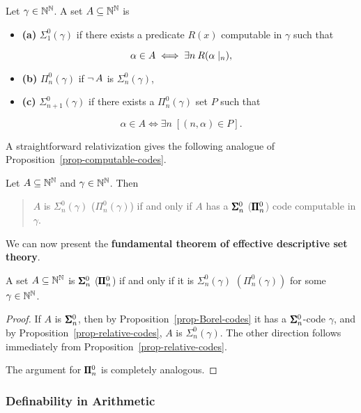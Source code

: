 \begin{definition}Let $\gamma \in \mathbb{N}^{\mathbb{N}}$. A set $A \subseteq \mathbb{N}^{\mathbb{N}}$ is

\begin{itemize}
\item \textbf{(a)} $\Sigma^0_1(\gamma)$ if there exists a predicate $R(x)$ computable in $\gamma$ such that
\end{itemize}
\begin{equation*}
\alpha \in A \iff \exists n \: R(\alpha\mid_{n}),
\end{equation*}
\begin{itemize}
\item \textbf{(b)} $\Pi^0_n(\gamma)$ if $\neg \, A$ is $\Sigma^0_n(\gamma)$,
\item \textbf{(c)} $\Sigma^0_{n+1}(\gamma)$ if there exists a $\Pi^0_n(\gamma)$ set $P$ such that
\end{itemize}
\begin{equation*}
\alpha \in A \iff \exists n \;[(n,\alpha) \in P].
\end{equation*}
\end{definition}A straightforward relativization gives the following analogue of Proposition~\ref{prop-computable-codes}.

\begin{proposition}\label{prop-relative-codes}Let $A \subseteq \mathbb{N}^{\mathbb{N}}$ and $\gamma \in \mathbb{N}^{\mathbb{N}}$. Then

\begin{quote}
$A$ is $\Sigma^0_n(\gamma)$ ($\Pi^0_n(\gamma)$) if and only if $A$ has a $\pmb{\Sigma}^0_n$ ($\pmb{\Pi}^0_n$) code computable in $\gamma$.
\end{quote}

\end{proposition}We can now present the \textbf{fundamental theorem of effective descriptive set theory}.

\begin{theorem}\label{thm-fundamental}A set $A \subseteq \mathbb{N}^{\mathbb{N}}$ is $\pmb{\Sigma}^0_n$ ($\pmb{\Pi}^0_n$) if and only if it is $\Sigma^0_n(\gamma)$ $(\Pi^0_n(\gamma))$ for some $\gamma \in \mathbb{N}^{\mathbb{N}}$.

\end{theorem}\begin{proof}If $A$ is $\pmb{\Sigma}^0_n$, then by Proposition~\ref{prop-Borel-codes} it has a $\pmb{\Sigma}^0_n$-code $\gamma$, and by Proposition~\ref{prop-relative-codes}, $A$ is $\Sigma^0_n(\gamma)$. The other direction follows immediately from Proposition~\ref{prop-relative-codes}.

The argument for $\pmb{\Pi}^0_n$ is completely analogous.

\end{proof}\subsubsection{Definability in Arithmetic}

